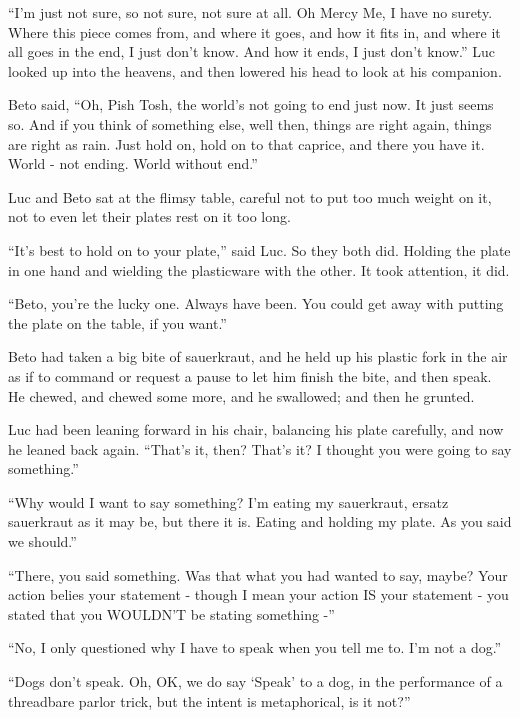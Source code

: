 
``I'm just not sure, so not sure, not sure at all. Oh Mercy Me, I have
no surety. Where this piece comes from, and where it goes, and how it
fits in, and where it all goes in the end, I just don't know. And how it
ends, I just don't know.'' Luc looked up into the heavens, and then
lowered his head to look at his companion.

Beto said, ``Oh, Pish Tosh, the world's not going to end just now. It
just seems so. And if you think of something else, well then, things are
right again, things are right as rain. Just hold on, hold on to that
caprice, and there you have it. World - not ending. World without end.''

Luc and Beto sat at the flimsy table, careful not to put too much weight
on it, not to even let their plates rest on it too long.

``It's best to hold on to your plate,'' said Luc. So they both did.
Holding the plate in one hand and wielding the plasticware with the
other. It took attention, it did.

``Beto, you're the lucky one. Always have been. You could get away with
putting the plate on the table, if you want.''

Beto had taken a big bite of sauerkraut, and he held up his plastic fork
in the air as if to command or request a pause to let him finish the
bite, and then speak. He chewed, and chewed some more, and he swallowed;
and then he grunted.

Luc had been leaning forward in his chair, balancing his plate
carefully, and now he leaned back again. ``That's it, then? That's it? I
thought you were going to say something.''

``Why would I want to say something? I'm eating my sauerkraut, ersatz
sauerkraut as it may be, but there it is. Eating and holding my plate.
As you said we should.''

``There, you said something. Was that what you had wanted to say, maybe?
Your action belies your statement - though I mean your action IS your
statement - you stated that you WOULDN'T be stating something -''

``No, I only questioned why I have to speak when you tell me to. I'm not
a dog.''

``Dogs don't speak. Oh, OK, we do say `Speak' to a dog, in the
performance of a threadbare parlor trick, but the intent is
metaphorical, is it not?''


